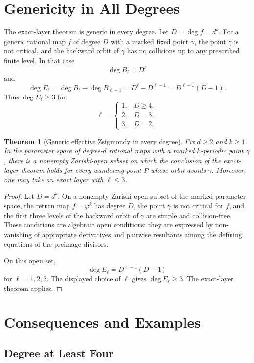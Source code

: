 \documentclass[11pt]{article}
\newtheorem{theorem}{Theorem}[section]
\begin{document}
\section{Genericity in All Degrees}

The exact-layer theorem is generic in every degree. Let \(D=\deg f=d^k\). For a generic rational map \(f\) of degree \(D\) with a marked fixed point \(\gamma\), the point \(\gamma\) is not critical, and the backward orbit of \(\gamma\) has no collisions up to any prescribed finite level. In that case
\[
\deg B_\ell=D^\ell
\]
and
\[
\deg E_\ell
=\deg B_\ell-\deg B_{\ell-1}
=D^\ell-D^{\ell-1}
=D^{\ell-1}(D-1).
\]
Thus \(\deg E_\ell\ge3\) for
\[
\ell=
\begin{cases}
1,&D\ge4,\\
2,&D=3,\\
3,&D=2.
\end{cases}
\]

\begin{theorem}[Generic effective Zsigmondy in every degree]
Fix \(d\ge2\) and \(k\ge1\). In the parameter space of degree-\(d\) rational maps with a marked \(k\)-periodic point \(\gamma\), there is a nonempty Zariski-open subset on which the conclusion of the exact-layer theorem holds for every wandering point \(P\) whose orbit avoids \(\gamma\). Moreover, one may take an exact layer with \(\ell\le3\).
\end{theorem}

\begin{proof}
Let \(D=d^k\). On a nonempty Zariski-open subset of the marked parameter space, the return map \(f=\varphi^k\) has degree \(D\), the point \(\gamma\) is not critical for \(f\), and the first three levels of the backward orbit of \(\gamma\) are simple and collision-free. These conditions are algebraic open conditions: they are expressed by non-vanishing of appropriate derivatives and pairwise resultants among the defining equations of the preimage divisors.

On this open set,
\[
\deg E_\ell=D^{\ell-1}(D-1)
\]
for \(\ell=1,2,3\). The displayed choice of \(\ell\) gives \(\deg E_\ell\ge3\). The exact-layer theorem applies.
\end{proof}

\section{Consequences and Examples}

\subsection{Degree at Least Four}
\end{document}

